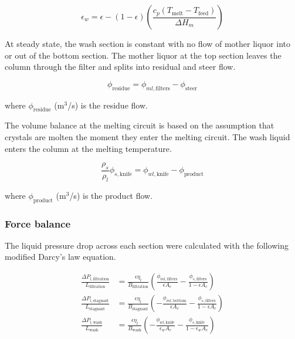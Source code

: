 \begin{equation}
\epsilon_{w}= \epsilon-(1-\epsilon)\left(\frac{c_p(T_{\mathrm{melt}}-T_{\mathrm{feed}})}{\Delta H_m}\right)
\end{equation}

At steady state, the wash section is constant with no flow of mother liquor into or out of the bottom section. The mother liquor at the top section leaves the column through the filter and splits into residual and steer flow. 

\begin{equation}
\phi_{\mathrm{residue}}= \phi_{ml,\mathrm{filters}} - \phi_{\mathrm{steer}}
\end{equation}

\noindent where $\phi_{\mathrm{residue}}$ (m$^3$/s) is the residue flow. 

The volume balance at the melting circuit is based on the assumption that crystals are molten the moment they enter the melting circuit. The wash liquid enters the column at the melting temperature.

\begin{equation}
\frac{\rho_s}{\rho_l}\phi_{s,\mathrm{knife}}= \phi_{wl,\mathrm{knife}} - \phi_{\mathrm{product}}
\end{equation}

\noindent where $\phi_{\mathrm{product}}$ (m$^3$/s) is the product flow.


\subsubsection{Force balance}
The liquid pressure drop across each section were calculated with the following modified Darcy's law equation. 

\begin{align}
    \frac{\Delta P_{l,\mathrm{filtration}}}{L_{\mathrm{filtration}}} &= \frac{\epsilon \eta_{l}}{B_{\mathrm{filtration}}}\left(\frac{\phi_{ml,\mathrm{filters}}}{\epsilon A_c} - \frac{\phi_{s,\mathrm{filters}}}{1-\epsilon A_c}\right) \\
    \frac{\Delta P_{l,\mathrm{stagnant}}}{L_{\mathrm{stagnant}}} &= \frac{\epsilon \eta_{l}}{B_{\mathrm{stagnant}}}\left(-\frac{\phi_{ml,\mathrm{bottom}}}{\epsilon A_c} - \frac{\phi_{s,\mathrm{filters}}}{1-\epsilon A_c}\right) \\
    \frac{\Delta P_{l,\mathrm{wash}}}{L_{\mathrm{wash}}} &= \frac{\epsilon \eta_{l}}{B_{\mathrm{wash}}}\left(-\frac{\phi_{wl,\mathrm{knife}}}{\epsilon_w A_c} - \frac{\phi_{s,\mathrm{knife}}}{1-\epsilon_w A_c}\right)
\end{align}

